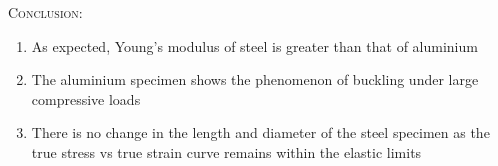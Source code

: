 \documentclass[a4paper, 11pt]{article}
\begin{document}
\textsc{Conclusion:}
\begin{enumerate}[label=\roman*)]
		\item As expected, Young's modulus of steel is greater than that of aluminium
		\item The aluminium specimen shows the phenomenon of buckling under large compressive loads
		\item There is no change in the length and diameter of the steel specimen as the true stress vs true strain curve remains within the elastic limits
\end{enumerate}
\end{document}
